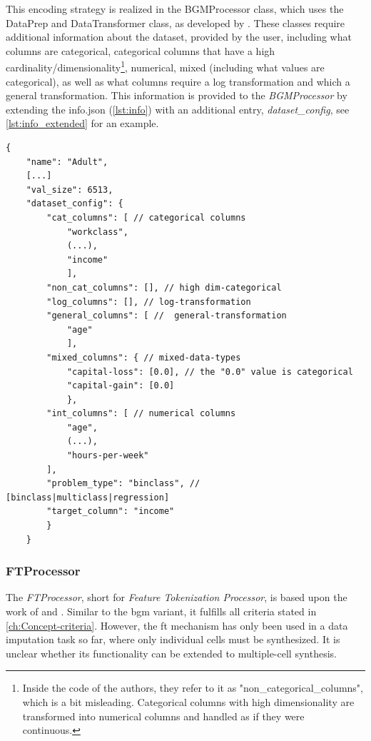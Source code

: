 This encoding strategy is realized in the BGMProcessor class, which uses the DataPrep and DataTransformer class, as developed by \cite{zhao2022CTABGANEnhancingTabular}.
These classes require additional information about the dataset, provided by the user, including what columns are categorical, categorical columns that have a high cardinality/dimensionality\footnote{Inside the code of the authors, they refer to it as "non\_categorical\_columns", which is a bit misleading. Categorical columns with high dimensionality are transformed into numerical columns and handled as if they were continuous.},
numerical, mixed (including what values are categorical), as well as what columns require a log transformation and which a general transformation.
This information is provided to the \textit{BGMProcessor} by extending the info.json (\autoref{lst:info}) with an additional entry, \textit{dataset\_config}, see \autoref{lst:info_extended} for an example.

\begin{lstlisting}[label={lst:info_extended},caption={Example extended data info file from the adult dataset (\autoref{ch:methods-datasets})}]
    {
    "name": "Adult",
    [...]
    "val_size": 6513,
    "dataset_config": {
        "cat_columns": [ // categorical columns
            "workclass", 
            (...), 
            "income"
            ],
        "non_cat_columns": [], // high dim-categorical
        "log_columns": [], // log-transformation
        "general_columns": [ //  general-transformation
            "age"
            ], 
        "mixed_columns": { // mixed-data-types
            "capital-loss": [0.0], // the "0.0" value is categorical           
            "capital-gain": [0.0]
            },
        "int_columns": [ // numerical columns 
            "age", 
            (...), 
            "hours-per-week"
        ],
        "problem_type": "binclass", // [binclass|multiclass|regression]
        "target_column": "income"
        }
    }
\end{lstlisting}

\subsubsection{FTProcessor}
\label{ch:FTProcessor}

The \textit{FTProcessor}, short for \textit{Feature Tokenization Processor}, is based upon the work of \textcite{zheng2022DiffusionModelsMissing} and \textcite{gorishniy2021RevisitingDeepLearning}.
Similar to the \gls{bgm} variant, it fulfills all criteria stated in \autoref{ch:Concept-criteria}.
However, the \gls{ft} mechanism has only been used in a data imputation task so far, where only individual cells must be synthesized.
It is unclear whether its functionality can be extended to multiple-cell synthesis.

